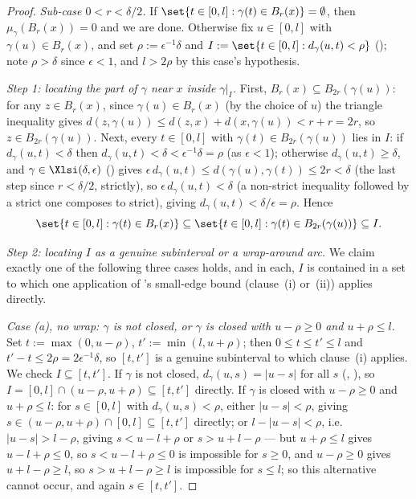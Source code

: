 \begin{proof}
  \emph{Sub-case $0 < r < \delta/2$.} If $\set{t \in [0,l] : \gamma(t) \in B_r(x)} = \emptyset$,
  then $\mu_\gamma(B_r(x)) = 0$ and we are done. Otherwise fix $u \in [0,l]$ with $\gamma(u) \in
  B_r(x)$, and set $\rho := \epsilon^{-1}\delta$ and $I := \set{t \in [0,l] : d_\gamma(u,t) < \rho}$
  (); note $\rho > \delta$ since $\epsilon < 1$, and $l > 2\rho$ by this case's
  hypothesis.

  \emph{Step 1: locating the part of $\gamma$ near $x$ inside $\gamma|_I$.} First, $B_r(x) \subseteq
  B_{2r}(\gamma(u))$: for any $z \in B_r(x)$, since $\gamma(u) \in B_r(x)$ (by the choice of $u$)
  the triangle inequality gives $d(z,\gamma(u)) \leq d(z,x) + d(x,\gamma(u)) < r + r = 2r$, so $z
  \in B_{2r}(\gamma(u))$. Next, every $t \in [0,l]$ with $\gamma(t) \in B_{2r}(\gamma(u))$ lies in
  $I$: if $d_\gamma(u,t) < \delta$ then $d_\gamma(u,t) < \delta < \epsilon^{-1}\delta = \rho$ (as
  $\epsilon<1$); otherwise $d_\gamma(u,t) \geq \delta$, and $\gamma \in \Xlsi(\delta,\epsilon)$
  () gives $\epsilon\, d_\gamma(u,t) \leq d(\gamma(u),\gamma(t)) \leq 2r < \delta$
  (the last step since $r<\delta/2$, strictly), so $\epsilon\, d_\gamma(u,t) < \delta$ (a
  non-strict inequality followed by a strict one composes to strict), giving $d_\gamma(u,t) <
  \delta/\epsilon = \rho$. Hence
  \[
    \set{t \in [0,l] : \gamma(t) \in B_r(x)} \subseteq \set{t \in [0,l] : \gamma(t) \in
    B_{2r}(\gamma(u))} \subseteq I
    .
  \]

  \emph{Step 2: locating $I$ as a genuine subinterval or a wrap-around arc.} We claim exactly one
  of the following three cases holds, and in each, $I$ is contained in a set to which one
  application of 's small-edge bound (clause~(i) or~(ii)) applies directly.

  \emph{Case (a), no wrap: $\gamma$ is not closed, or $\gamma$ is closed with $u-\rho \geq 0$ and
  $u+\rho \leq l$.} Set $t := \max(0,u-\rho)$, $t' := \min(l,u+\rho)$; then $0 \leq t \leq t' \leq
  l$ and $t'-t \leq 2\rho = 2\epsilon^{-1}\delta$, so $[t,t']$ is a genuine subinterval to which
  clause~(i) applies. We check $I \subseteq [t,t']$. If $\gamma$ is not closed, $d_\gamma(u,s) =
  |u-s|$ for all $s$ (, ), so $I = [0,l]\cap(u-\rho,u+\rho)
  \subseteq [t,t']$ directly. If $\gamma$ is closed with $u-\rho\geq0$ and $u+\rho\leq l$: for $s
  \in [0,l]$ with
  $d_\gamma(u,s) < \rho$, either $|u-s|<\rho$, giving $s \in (u-\rho,u+\rho)\cap[0,l] \subseteq
  [t,t']$ directly; or $l - |u-s| < \rho$, i.e. $|u-s| > l-\rho$, giving $s < u-l+\rho$ or $s >
  u+l-\rho$ — but $u+\rho\leq l$ gives $u-l+\rho \leq 0$, so $s<u-l+\rho\leq0$ is impossible for
  $s\geq0$, and $u-\rho\geq0$ gives $u+l-\rho\geq l$, so $s>u+l-\rho\geq l$ is impossible for
  $s\leq l$; so this alternative cannot occur, and again $s\in[t,t']$.


\end{proof}
